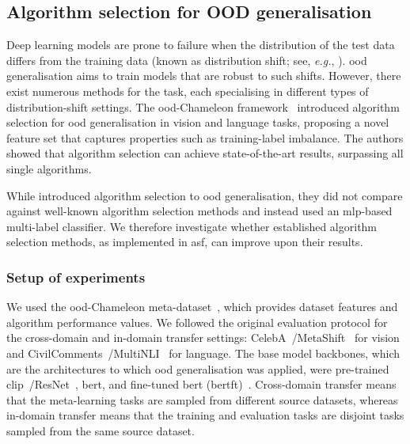 \subsection{Algorithm selection for OOD generalisation}
\label{sec:ood}

Deep learning models are prone to failure when the distribution of the test data differs from the training data (known as distribution shift; see, \emph{e.g.}, \citet{WilEtAl22}). \Gls{ood} generalisation aims to train models that are robust to such shifts.
However, there exist numerous methods for the task, each specialising in different types of distribution-shift settings.
The \gls{ood}-Chameleon framework~\citep{JiaEtAl25} introduced algorithm selection for \gls{ood} generalisation in vision and language tasks, proposing a novel feature set that captures properties such as training-label imbalance.
The authors showed that algorithm selection can achieve state-of-the-art results, surpassing all single algorithms.

While \citet{JiaEtAl25} introduced algorithm selection to \gls{ood} generalisation, they did not compare against well-known algorithm selection methods and instead used an \gls{mlp}-based multi-label classifier.
We therefore investigate whether established algorithm selection methods, as implemented in \gls{asf}, can improve upon their results.


\subsubsection{Setup of experiments}
We used the \gls{ood}-Chameleon meta-dataset~\citep{JiaEtAl25}, which provides dataset features and algorithm performance values. We followed the original evaluation protocol for the cross-domain and in-domain transfer settings: CelebA~\citep{LiuEtAl15}/MetaShift~\citep{LiaEtAl22} for vision and CivilComments~\citep{BorEtAl19}/MultiNLI~\citep{WilEtAl18} for language. The base model backbones, which are the architectures to which \gls{ood} generalisation was applied, were pre-trained \gls{clip}~\citep{RadEtAl21}/ResNet~\citep{HeEtAl16}, \gls{bert}, and fine-tuned \gls{bert} (\gls{bertft})~\citep{DevEtAl19}. Cross-domain transfer means that the meta-learning tasks are sampled from different source datasets, whereas in-domain transfer means that the training and evaluation tasks are disjoint tasks sampled from the same source dataset.


